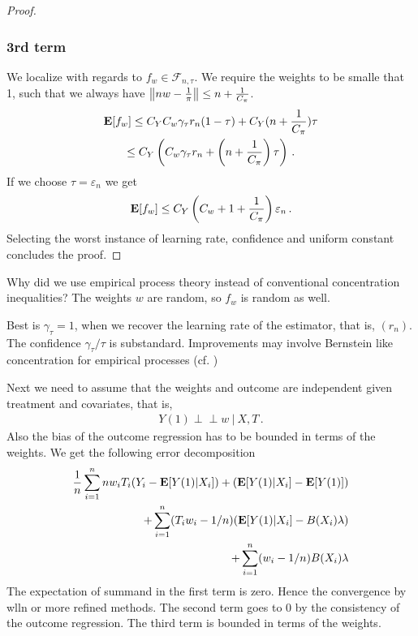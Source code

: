 \begin{proof}
\subsubsection*{3rd term}
We localize with regards to 
$
f_w \in \mathcal{F}_{n,\tau}
.
$
We require the weights to be smalle that 1, such that 
we always have
$
\left\lVert nw-  \frac{1}{\pi}\right\rVert
\le
n + \frac{1}{C_\pi}
$.
\begin{gather}
  \mathbf{E}[f_w]
  \le
  C_Y 
  C_w
  \gamma_\tau
  r_n
  (1-\tau)
  +
  C_Y
  (
n + \frac{1}{C_\pi}
  )
  \tau
  \\
  \le
  C_Y
  \left( 
  C_w
  \gamma_\tau
  r_n
  +
  \left(
n + \frac{1}{C_\pi}
  \right)
  \tau
  \right)
  \,.
\end{gather}
If we choose  $\tau=\varepsilon_n$
we get
\begin{gather}
  \mathbf{E}[f_w]
  \le
  C_Y
  \left( 
C_w+1+ \frac{1}{C_\pi}
  \right)
  \varepsilon_n
  \,.
\end{gather}
Selecting the worst instance of learning rate, confidence and uniform constant concludes the proof.

\end{proof}

\begin{reflection*}
  Why did we use empirical process theory instead of conventional concentration inequalities?
  The weights $w$ are random, so $f_w$ is random as well. 

Best is $\gamma_\tau=1$, when we recover the learning rate of the estimator, that is, $(r_n)$.
The confidence $\gamma_\tau/\tau$ is substandard. Improvements may involve Bernstein like concentration for empirical processes (cf. \cite[Section~2.14.2]{vaart2013})
\end{reflection*}

Next we need to assume that the weights and outcome are independent given treatment and covariates, that is,
\begin{gather}
  Y\!(1)\perp\!\!\!\perp w\ |\ X,T 
  \,.
\end{gather}
Also the bias of the outcome regression has to be bounded in terms of the weights. We get the following error decomposition
\begin{align}
  \frac{1}{n}
  \sum_{i=1}^{n}
  nw_i T_i (Y_i - \mathbf{E}[Y(1)|X_i])
  +
  (\mathbf{E}[Y(1)|X_i]-\mathbf{E}[Y(1)])
  \\
  +
  \sum_{i=1}^{n} 
  (T_i w_i-1/n)
  (
  \mathbf{E}[Y(1)|X_i]
  -
  B(X_i)\lambda
  )
  \\
  +
  \sum_{i=1}^{n} 
  (w_i-1/n)
  B(X_i)\lambda
\end{align}
The expectation of summand in the first term is zero. Hence the convergence by wlln or more refined methods.
The second term goes to 0 by the consistency of the outcome regression.
The third term is bounded in terms of the weights.

